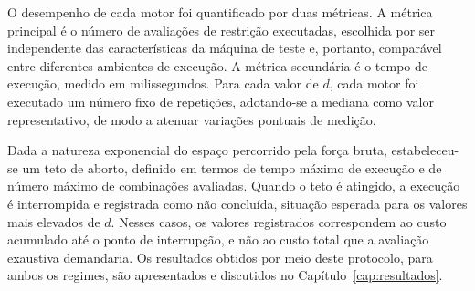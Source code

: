 O desempenho de cada motor foi quantificado por duas métricas. A métrica principal é o
número de avaliações de restrição executadas, escolhida por ser independente das
características da máquina de teste e, portanto, comparável entre diferentes ambientes de
execução. A métrica secundária é o tempo de execução, medido em milissegundos. Para cada
valor de $d$, cada motor foi executado um número fixo de repetições, adotando-se a mediana
como valor representativo, de modo a atenuar variações pontuais de medição.

Dada a natureza exponencial do espaço percorrido pela força bruta, estabeleceu-se um teto de
aborto, definido em termos de tempo máximo de execução e de número máximo de combinações
avaliadas. Quando o teto é atingido, a execução é interrompida e registrada como não
concluída, situação esperada para os valores mais elevados de $d$. Nesses casos, os valores
registrados correspondem ao custo acumulado até o ponto de interrupção, e não ao custo total
que a avaliação exaustiva demandaria. Os resultados obtidos por meio deste protocolo, para
ambos os regimes, são apresentados e discutidos no Capítulo~\ref{cap:resultados}.


